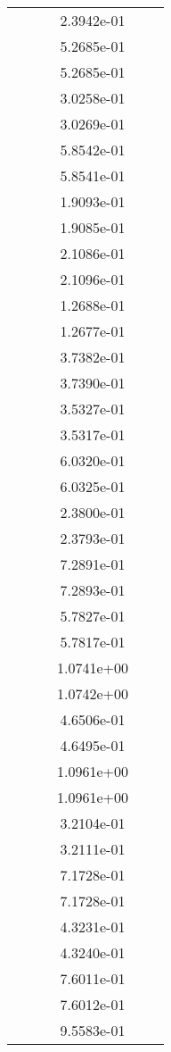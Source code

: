 \begin{xltabular}{\textwidth}{r|rS[table-format=1.3e+2]S[table-format=1.4e+2]S[table-format=1.4e+2]S[table-format=-1.5]}
&  &  & 2.3942e-01 & & \\
&  &  & 5.2685e-01 & & \\
&  &  & 5.2685e-01 & & \\
&  &  & 3.0258e-01 & & \\
&  &  & 3.0269e-01 & & \\
&  &  & 5.8542e-01 & & \\
&  &  & 5.8541e-01 & & \\
&  &  & 1.9093e-01 & & \\
&  &  & 1.9085e-01 & & \\
&  &  & 2.1086e-01 & & \\
&  &  & 2.1096e-01 & & \\
&  &  & 1.2688e-01 & & \\
&  &  & 1.2677e-01 & & \\
&  &  & 3.7382e-01 & & \\
&  &  & 3.7390e-01 & & \\
&  &  & 3.5327e-01 & & \\
&  &  & 3.5317e-01 & & \\
&  &  & 6.0320e-01 & & \\
&  &  & 6.0325e-01 & & \\
&  &  & 2.3800e-01 & & \\
&  &  & 2.3793e-01 & & \\
&  &  & 7.2891e-01 & & \\
&  &  & 7.2893e-01 & & \\
&  &  & 5.7827e-01 & & \\
&  &  & 5.7817e-01 & & \\
&  &  & 1.0741e+00 & & \\
&  &  & 1.0742e+00 & & \\
&  &  & 4.6506e-01 & & \\
&  &  & 4.6495e-01 & & \\
&  &  & 1.0961e+00 & & \\
&  &  & 1.0961e+00 & & \\
&  &  & 3.2104e-01 & & \\
&  &  & 3.2111e-01 & & \\
&  &  & 7.1728e-01 & & \\
&  &  & 7.1728e-01 & & \\
&  &  & 4.3231e-01 & & \\
&  &  & 4.3240e-01 & & \\
&  &  & 7.6011e-01 & & \\
&  &  & 7.6012e-01 & & \\
&  &  & 9.5583e-01 & & \\

\end{xltabular}
